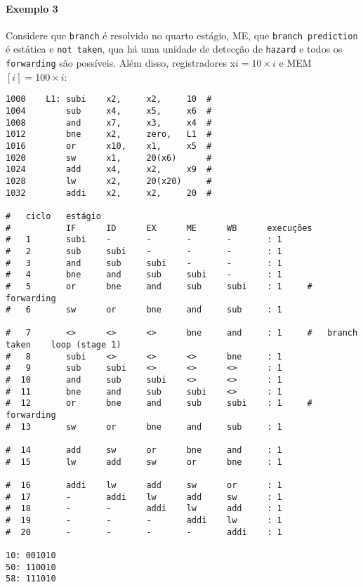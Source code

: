 \documentclass{article}
\begin{document}
\paragraph{Exemplo 3}Considere que \texttt{branch} é resolvido no quarto estágio, ME, que \texttt{branch prediction} é estática e \texttt{not taken}, qua há uma unidade de detecção de \texttt{hazard} e todos os \texttt{forwarding} são possíveis. Além disso, registradores x$i = 10\times i$ e MEM$[i] = 100\times i$:
\begin{scriptsize}
    \myStyleRISCV
    \begin{lstlisting}
1000    L1: subi    x2,     x2,     10  # 
1004        sub     x4,     x5,     x6  # 
1008        and     x7,     x3,     x4  # 
1012        bne     x2,     zero,   L1  # 
1016        or      x10,    x1,     x5  # 
1020        sw      x1,     20(x6)      # 
1024        add     x4,     x2,     x9  # 
1028        lw      x2,     20(x20)     # 
1032        addi    x2,     x2,     20  # 

#   ciclo   estágio
#           IF      ID      EX      ME      WB      execuções
#   1       subi    -       -       -       -       : 1
#   2       sub     subi    -       -       -       : 1
#   3       and     sub     subi    -       -       : 1
#   4       bne     and     sub     subi    -       : 1
#   5       or      bne     and     sub     subi    : 1     # forwarding
#   6       sw      or      bne     and     sub     : 1

#   7       <>      <>      <>      bne     and     : 1     #   branch taken    loop (stage 1)
#   8       subi    <>      <>      <>      bne     : 1
#   9       sub     subi    <>      <>      <>      : 1
#  10       and     sub     subi    <>      <>      : 1
#  11       bne     and     sub     subi    <>      : 1
#  12       or      bne     and     sub     subi    : 1     # forwarding
#  13       sw      or      bne     and     sub     : 1

#  14       add     sw      or      bne     and     : 1
#  15       lw      add     sw      or      bne     : 1

#  16       addi    lw      add     sw      or      : 1
#  17       -       addi    lw      add     sw      : 1
#  18       -       -       addi    lw      add     : 1
#  19       -       -       -       addi    lw      : 1
#  20       -       -       -       -       addi    : 1

10: 001010
50: 110010
58: 111010
    \end{lstlisting}
\end{scriptsize}
\end{document}
